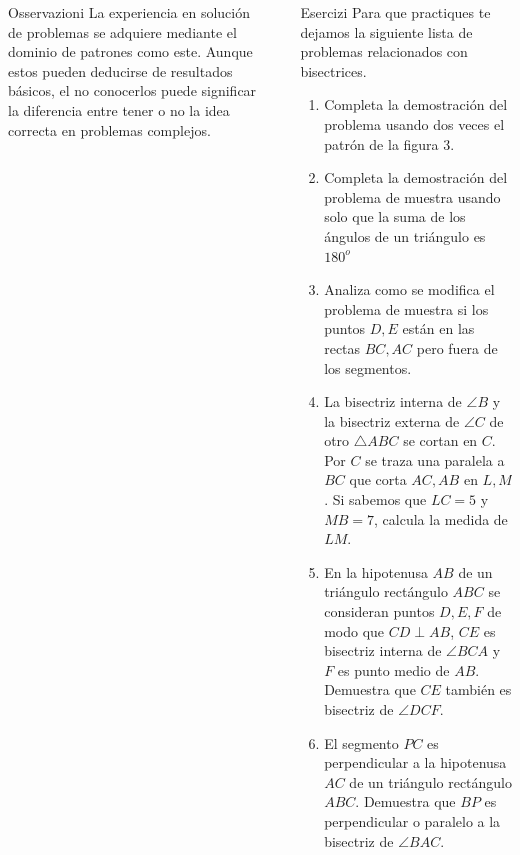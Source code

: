 \documentclass[final]{beamer}
\newlength{\sepwid}
\newlength{\onecolwid}
\begin{document}
\begin{frame}[t]
\begin{columns}[t]
\begin{column}{\onecolwid}
\begin{block}{Osservazioni}
La experiencia en solución de problemas se adquiere mediante el dominio de patrones como este. Aunque estos pueden deducirse de resultados básicos, el no conocerlos puede significar la diferencia entre tener o no la idea correcta en problemas complejos.
\end{block}

\end{column} %

\begin{column}{\sepwid}\end{column} %

\begin{column}{\onecolwid} %


\begin{block}{Esercizi}
Para que practiques te dejamos la siguiente lista de problemas relacionados con bisectrices.
\begin{enumerate}
\item Completa la demostración del problema usando dos veces el patrón de la figura 3.
\item Completa la demostración del problema de muestra usando solo que la suma de los ángulos de un triángulo es $180^o$
\item Analiza como se modifica el problema de muestra si los puntos $D, E$ están en las rectas $BC, AC$ pero fuera de los segmentos.
\item La bisectriz interna de $\angle B$ y la bisectriz externa de $\angle C$ de otro $\triangle ABC$ se cortan en $C$. Por $C$ se traza una paralela a $BC$ que corta $AC, AB$ en $L, M$. Si sabemos que $LC=5$ y $MB=7$, calcula la medida de $LM$.
\item En la hipotenusa $AB$ de un triángulo rectángulo $ABC$ se consideran puntos $D, E, F$ de modo que $CD \perp AB$, $CE$ es bisectriz interna de $\angle BCA$ y $F$ es punto medio de $AB$. Demuestra que $CE$ también es bisectriz de $\angle DCF$.
\item El segmento $PC$ es perpendicular a la hipotenusa $AC$ de un triángulo rectángulo $ABC$. Demuestra que $BP$ es perpendicular o paralelo a la bisectriz de $\angle BAC$.
\end{enumerate}
\end{block}


\end{column}
\end{columns}
\end{frame}
\end{document}
